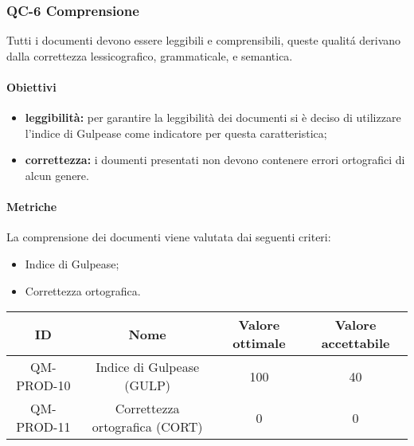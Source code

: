 \subsubsection{QC-6 Comprensione}
Tutti i documenti devono essere leggibili e comprensibili, queste qualitá derivano dalla correttezza lessicografico, grammaticale, e semantica.
	\paragraph{Obiettivi}
		\begin{itemize}
			\item \textbf{leggibilità:} per garantire la leggibilità dei documenti si è deciso di utilizzare l'indice di Gulpease come indicatore per questa caratteristica;
			\item \textbf{correttezza:} i doumenti presentati non devono contenere errori ortografici di alcun genere.
		\end{itemize}
	\paragraph{Metriche}
	La comprensione dei documenti viene valutata dai seguenti criteri:
	\begin{itemize}
		\item Indice di Gulpease;
    \item Correttezza ortografica.
	\end{itemize}
	\begin{center}
		\begin{tabular}{|c|c|c|c|}
			\rowcolor{lighter-grayer}
			\hline
			ID & Nome & Valore ottimale & Valore accettabile \\
			\hline
			QM-PROD-10 & Indice di Gulpease (GULP) & 100 & 40 \\
      \hline
			QM-PROD-11 & Correttezza ortografica (CORT) & 0 & 0 \\
			\hline
		\end{tabular}
	\end{center}
